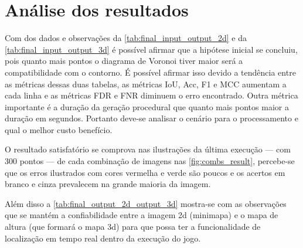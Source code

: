 \section{Análise dos resultados}

Com dos dados e observações da \cref{tab:final_input_output_2d} e da \cref{tab:final_input_output_3d} é possível afirmar que a hipótese inicial se concluiu, pois quanto mais pontos o diagrama de Voronoi tiver maior será a compatibilidade com o contorno. É possível afirmar isso devido a tendência entre as métricas dessas duas tabelas, as métricas IoU, Acc, F1 e MCC aumentam a cada linha e as métricas FDR  e FNR diminuem o erro encontrado. Outra métrica importante é a duração da geração procedural que quanto mais pontos maior a duração em segundos. Portanto deve-se analisar o cenário para o processamento e qual o melhor custo benefício.

O resultado satisfatório se comprova nas ilustrações da última execução — com 300 pontos — de cada combinação de imagens nas \cref{fig:combs_result}, percebe-se que os erros ilustrados com cores vermelha e verde são poucos e os acertos em branco e cinza prevalecem na grande maioria da imagem.

Além disso a \cref{tab:final_output_2d_output_3d} mostra-se com as observações que se mantém a confiabilidade entre a imagem 2d (minimapa) e o mapa de altura (que formará o mapa 3d) para que possa ter a funcionalidade de localização em tempo real dentro da execução do jogo.


